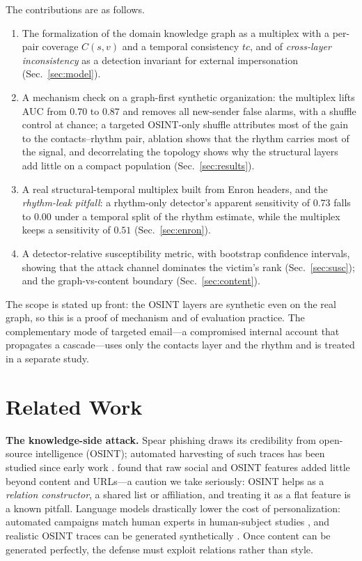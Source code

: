 \documentclass[conference]{IEEEtran}
\begin{document}
The contributions are as follows.
\begin{enumerate}
  \item The formalization of the domain knowledge graph as a multiplex with a per-pair coverage $C(s,v)$ and
  a temporal consistency $tc$, and of \emph{cross-layer inconsistency} as a detection invariant for external
  impersonation (Sec.~\ref{sec:model}).
  \item A mechanism check on a graph-first synthetic organization: the multiplex lifts AUC from $0.70$ to
  $0.87$ and removes all new-sender false alarms, with a shuffle control at chance; a targeted OSINT-only
  shuffle attributes most of the gain to the contacts--rhythm pair, ablation shows that the
  rhythm carries most of the signal, and decorrelating the topology shows why the structural layers add
  little on a compact population (Sec.~\ref{sec:results}).
  \item A real structural-temporal multiplex built from Enron headers, and the \emph{rhythm-leak pitfall}: a
  rhythm-only detector's apparent sensitivity of $0.73$ falls to $0.00$ under a temporal split of the rhythm
  estimate, while the multiplex keeps a sensitivity of $0.51$ (Sec.~\ref{sec:enron}).
  \item A detector-relative susceptibility metric, with bootstrap confidence intervals, showing that the attack
  channel dominates the victim's rank (Sec.~\ref{sec:susc}); and the graph-vs-content boundary
  (Sec.~\ref{sec:content}).
\end{enumerate}
The scope is stated up front: the OSINT layers are synthetic even on the real graph, so this is a proof of
mechanism and of evaluation practice. The complementary mode of targeted email---a compromised internal
account that propagates a cascade---uses only the contacts layer and the rhythm and is treated in a separate
study.

\section{Related Work}
\label{sec:related}
\textbf{The knowledge-side attack.} Spear phishing draws its credibility from open-source intelligence
(OSINT); automated harvesting of such traces has been studied since early work \cite{edwards2017panning}.
\cite{dewan2014analyzing,dewan2017facebook} found that raw social and OSINT features added little beyond content
and URLs---a caution we take seriously: OSINT helps as a \emph{relation constructor}, a shared list or
affiliation, and treating it as a flat feature is a known pitfall. Language models drastically lower the cost
of personalization: automated campaigns match human experts in human-subject studies \cite{bethany2024evaluating},
and realistic OSINT traces can be generated synthetically \cite{brown2025web}. Once content can be generated
perfectly, the defense must exploit relations rather than style.
\end{document}
